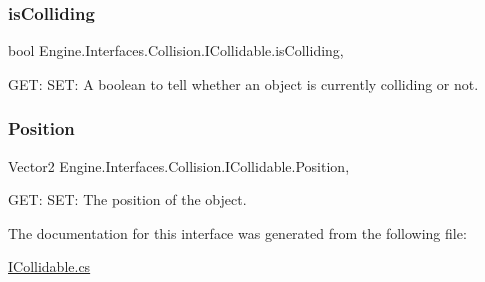 \subsubsection{\texorpdfstring{is\+Colliding}{isColliding}}
{\footnotesize\ttfamily bool Engine.\+Interfaces.\+Collision.\+I\+Collidable.\+is\+Colliding\hspace{0.3cm}{\ttfamily [get]}, {\ttfamily [set]}}



G\+ET\+: S\+ET\+: A boolean to tell whether an object is currently colliding or not. 

\mbox{\label{a00426_a4e17a9b41927fab6d2973c4feb0a993a}} 
\subsubsection{\texorpdfstring{Position}{Position}}
{\footnotesize\ttfamily Vector2 Engine.\+Interfaces.\+Collision.\+I\+Collidable.\+Position\hspace{0.3cm}{\ttfamily [get]}, {\ttfamily [set]}}



G\+ET\+: S\+ET\+: The position of the object. 



The documentation for this interface was generated from the following file\+:\begin{DoxyCompactItemize}
\item 
\hyperlink{a00101}{I\+Collidable.\+cs}\end{DoxyCompactItemize}
